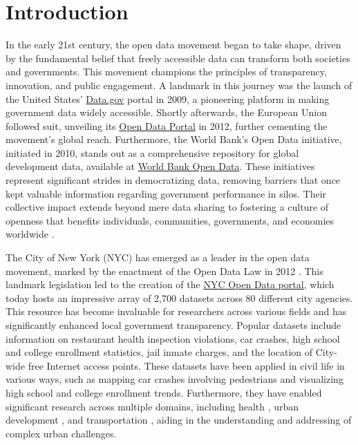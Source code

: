 \documentclass[linenumber]{jdsart}
\begin{document}
\section{Introduction} 
\label{sec:intro}

In the early 21st century, the open data movement began 
to take shape, driven by the fundamental belief that 
freely accessible data can transform both societies and 
governments. This movement champions the principles
of transparency, innovation, and public engagement. 
A landmark in this journey was the launch of the United States'
\href{https://www.data.gov}{Data.gov} portal in 2009, a pioneering
platform in making government data widely accessible. Shortly afterwards,
the European Union followed suit, unveiling its
\href{https://data.europa.eu/euodp}{Open Data Portal} in 2012, further
cementing the movement's global reach. Furthermore, the World Bank's Open
Data initiative, initiated in 2010, stands out as a comprehensive
repository for global development data, available at
\href{https://data.worldbank.org}{World Bank Open Data}. 
These initiatives represent significant strides in democratizing data, 
removing barriers that once kept valuable information 
regarding government performance in silos. Their collective impact 
extends beyond mere data sharing to fostering a culture of openness 
that benefits individuals, communities, governments, and economies worldwide 
\citep{barns2016mine, wang2016adoption}.


The City of New York (NYC) has emerged as a leader in the open data movement,
marked by the enactment of the Open Data Law in 2012
\citep{zuiderwijk2014open}. This landmark legislation led to the
creation of the \href{https://opendata.cityofnewyork.us}{NYC Open Data
  portal}, which today hosts an impressive array of 2,700 datasets
across 80 different city agencies. This resource has become invaluable
for researchers across various fields and has significantly enhanced
local government transparency. Popular datasets include information on
restaurant health inspection violations, car crashes, high school and
college enrollment statistics, jail inmate charges, and the location
of City\mbox{-}wide free Internet access points. These datasets have been
applied in civil life in various ways, such as mapping car crashes
involving pedestrians and visualizing high school and college
enrollment trends. Furthermore, they have enabled significant research
across multiple domains, including health \citep{cantor2018facets, 
shankar2021data}, urban development \citep{neves2020impacts}, and
transportation \citep{gerte2019understanding}, aiding in the
understanding and addressing of complex urban challenges.
\end{document}
